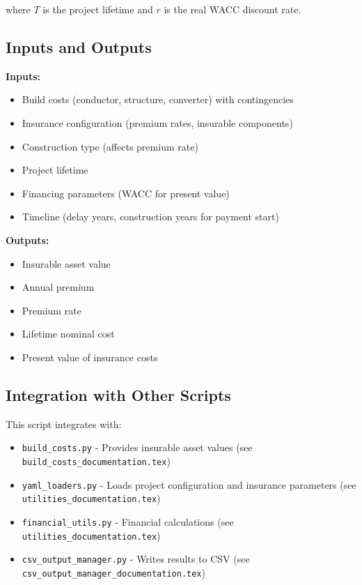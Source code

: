 \documentclass[12pt]{article}
\begin{document}
where $T$ is the project lifetime and $r$ is the real WACC discount rate.

\subsection{Inputs and Outputs}

\textbf{Inputs:}
\begin{itemize}
    \item Build costs (conductor, structure, converter) with contingencies
    \item Insurance configuration (premium rates, insurable components)
    \item Construction type (affects premium rate)
    \item Project lifetime
    \item Financing parameters (WACC for present value)
    \item Timeline (delay years, construction years for payment start)
\end{itemize}

\textbf{Outputs:}
\begin{itemize}
    \item Insurable asset value
    \item Annual premium
    \item Premium rate
    \item Lifetime nominal cost
    \item Present value of insurance costs
\end{itemize}

\subsection{Integration with Other Scripts}

This script integrates with:
\begin{itemize}
    \item \texttt{build\_costs.py} - Provides insurable asset values (see \texttt{build\_costs\_documentation.tex})
    \item \texttt{yaml\_loaders.py} - Loads project configuration and insurance parameters (see \texttt{utilities\_documentation.tex})
    \item \texttt{financial\_utils.py} - Financial calculations (see \texttt{utilities\_documentation.tex})
    \item \texttt{csv\_output\_manager.py} - Writes results to CSV (see \texttt{csv\_output\_manager\_documentation.tex})
\end{itemize}
\end{document}
